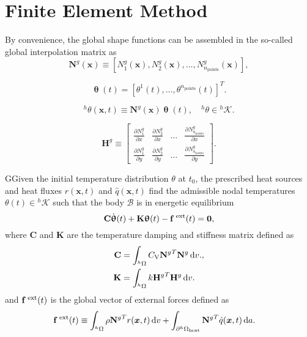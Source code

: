 \section{Finite Element Method}

By convenience, the global shape functions can be assembled in the so-called global interpolation matrix as
\begin{equation}
\mathbf{N}^{g}(\boldsymbol{x}) \equiv\left[N_1^g(\bm x), N_2^g(\bm x), \dots, N^g_{n_\text{points}}(\bm x)\right],
\end{equation}

\begin{equation}
 \bm \uptheta (t)= \left[\theta^{1}(t), \dots, \theta^{n_{\text {points}}}(t)\right]^{T}.
\end{equation}

\begin{highlight}
\begin{equation}
{ }^{h} \theta(\bm{x},t) \equiv \mathbf{N}^{g}(\bm{x}) \bm{\uptheta}(t), \quad{ }^{h} \theta \in{ }^{h} \mathscr{K}.
\end{equation}
\end{highlight}

\begin{equation}
  \mathbf H^g\equiv \left[
  \begin{array}{cccc}
    \displaystyle{\frac{\partial N^g_1}{\partial x}} & \displaystyle{\frac{\partial N^g_2}{\partial x}} & \dots & \displaystyle{\frac{\partial N^g_{n_\text{points}}}{\partial x}} \\[10pt]
    \displaystyle{\frac{\partial N^g_1}{\partial y}} & \displaystyle{\frac{\partial N^g_2}{\partial y}} & \dots & \displaystyle{\frac{\partial N^g_{n_\text{points}}}{\partial y}}
  \end{array}
  \right].
\end{equation}

\begin{problem}
GGiven the initial temperature distribution $\theta$ at $t_0$, the prescribed heat sources and heat fluxes $r(\bm x, t)$ and $\hat q(\bm x, t)$ find the admissible nodal temperatures $\theta(t)\in {^h\mathscr{K}}$ such that the body $\mathscr{B}$ is in energetic equilibrium
\begin{equation}
    \mathbf C \dot{ \bm\uptheta}(t) +\mathbf K\bm\uptheta(t)-\mathbf f^\text{\;ext}(t)=\mathbf 0, \label{eq:equilibrium_material}
\end{equation}
where $\mathbf C$ and \(\mathbf K\) are the temperature damping and stiffness matrix defined as
\begin{align}
  \mathbf C &= \int_{{}^h\Omega} C_\mathrm{V} {\mathbf{N}^g}^T \mathbf{N}^g \,\mathrm{d} v.,\\
  \mathbf K &= \int_{{}^h\Omega} k {\mathbf{H}^g}^T\mathbf{H}^g \,\mathrm{d} v.
\end{align}
and $\mathbf f^\text{\;ext}(t)$ is the global vector of external forces defined as
\begin{align}
    \mathbf f^\text{\;ext}(t) &\equiv \int_{^h\Omega} \rho{\mathbf N^g}^T r(\bm x, t)\,\mathrm{d} v + \int_{\partial^h\Omega_\text{heat}}{\mathbf N^g}^T \hat q(\bm x, t)\,\mathrm{d} a.
\end{align}
\end{problem}
